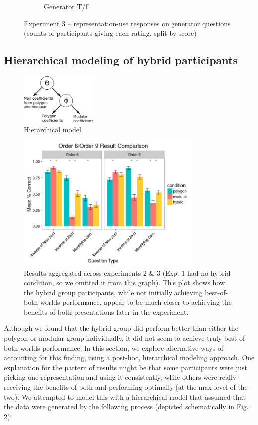 \documentclass[man,mask,10pt]{apa6}
\begin{document}
\begin{figure}
\begin{subfigure}[c]{0.45\textwidth}
\caption{Generator T/F}
\end{subfigure}
\caption{Experiment 3 -- representation-use responses on generator questions (counts of participants giving each rating, split by score)}

\label{ex3_wr_gen}
\end{figure}
\subsection{Hierarchical modeling of hybrid participants}
\begin{figure}
\centering
\includegraphics[width=0.33\textwidth]{figures/hierarchical_model_schematic.png}
\caption{Hierarchical model}
\label{hierarchicalmodel}
\end{figure}
\begin{figure}
\centering
\includegraphics[width=0.8\textwidth]{figures/order_69_results.png}
\caption{Results aggregated across experiments 2 \& 3 (Exp. 1 had no hybrid condition, so we omitted it from this graph). This plot shows how the hybrid group participants, while not initially achieving best-of-both-worlds performance, appear to be much closer to achieving the benefits of both presentations later in the experiment.}
\label{order_69_results}
\end{figure}
Although we found that the hybrid group did perform better than either the polygon or modular group individually, it did not seem to achieve truly best-of-both-worlds performance. In this section, we explore alternative ways of accounting for this finding, using a post-hoc, hierarchical modeling approach. One explanation for the pattern of results might be that some participants were just picking one representation and using it consistently, while others were really receiving the benefits of both and performing optimally (at the max level of the two). We attempted to model this with a hierarchical model that assumed that the data were generated by the following process (depicted schematically in Fig. \ref{hierarchicalmodel}): 
\end{document}

